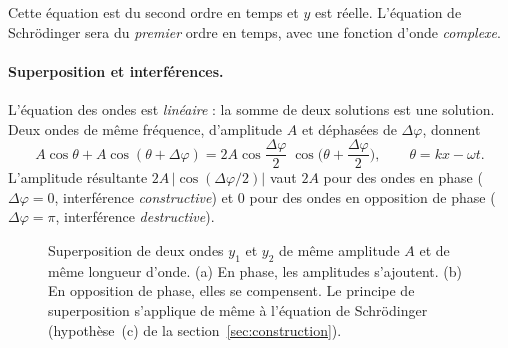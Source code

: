 \begin{remarque}
Cette équation est du second ordre en temps et $y$ est réelle. L'équation de
Schrödinger sera du \emph{premier} ordre en temps, avec une fonction d'onde
\emph{complexe}.
\end{remarque}

\paragraph{Superposition et interférences.} L'équation des ondes est \emph{linéaire} : la somme
de deux solutions est une solution. Deux ondes de même fréquence, d'amplitude $A$ et déphasées de
$\Delta\varphi$, donnent
\[
  A\cos\theta+A\cos(\theta+\Delta\varphi)
  =2A\cos\frac{\Delta\varphi}{2}\;\cos\!\Big(\theta+\frac{\Delta\varphi}{2}\Big),
  \qquad\theta=kx-\omega t .
\]
L'amplitude résultante $2A\,|\cos(\Delta\varphi/2)|$ vaut $2A$ pour des ondes en phase
($\Delta\varphi=0$, interférence \emph{constructive}) et $0$ pour des ondes en opposition de phase
($\Delta\varphi=\pi$, interférence \emph{destructive}).

\begin{figure}[!ht]
\centering
{}
\caption{Superposition de deux ondes $y_1$ et $y_2$ de même amplitude $A$ et de même
longueur d'onde. (a) En phase, les amplitudes s'ajoutent. (b) En opposition de phase, elles se
compensent. Le principe de superposition s'applique de même à l'équation de Schrödinger
(hypothèse~(c) de la section~\ref{sec:construction}).}
\label{fig:interferences}
\end{figure}

